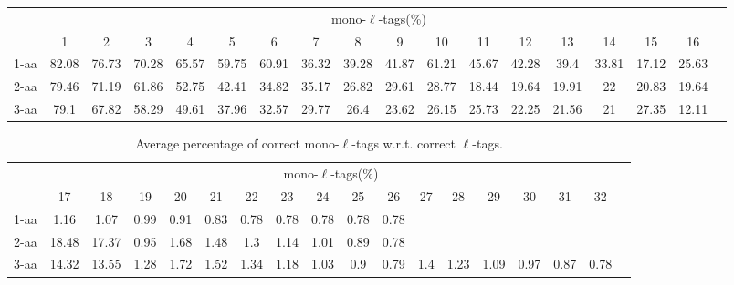 \documentclass{article}[12pt]
\begin{document}
\begin{landscape}

\begin{table}[h]\tiny
\vspace{3mm}
{\centering
\begin{center}
\begin{tabular}{|l|c|c|c|c|c|c|c|c|c|c|c|c|c|c|c|c|c|}
  \hline
  & \multicolumn{ 16 }{|c|}{mono-$\ell$-tags(\%)} \\
  \cline{2- 17}
    & 1 & 2 & 3 & 4 & 5 & 6 & 7 & 8 & 9 & 10 & 11 & 12 & 13 & 14 & 15 & 16\\
  \hline
1-aa  & 82.08 & 76.73 & 70.28 & 65.57 & 59.75 & 60.91 & 36.32 & 39.28 & 41.87 & 61.21 & 45.67 & 42.28 & 39.4 & 33.81 & 17.12 & 25.63\\
2-aa  & 79.46 & 71.19 & 61.86 & 52.75 & 42.41 & 34.82 & 35.17 & 26.82 & 29.61 & 28.77 & 18.44 & 19.64 & 19.91 & 22 & 20.83 & 19.64\\
3-aa  & 79.1 & 67.82 & 58.29 & 49.61 & 37.96 & 32.57 & 29.77 & 26.4 & 23.62 & 26.15 & 25.73 & 22.25 & 21.56 & 21 & 27.35 & 12.11\\
 \hline
\end{tabular}
\end{center}
\par}
\centering

\vspace{3mm}
\end{table}
\begin{table}[h]\tiny
\vspace{3mm}
{\centering
\begin{center}
\begin{tabular}{|l|c|c|c|c|c|c|c|c|c|c|c|c|c|c|c|c|c|}
  \hline
  & \multicolumn{ 16 }{|c|}{mono-$\ell$-tags(\%)} \\
  \cline{2- 17}
    & 17 & 18 & 19 & 20 & 21 & 22 & 23 & 24 & 25 & 26 & 27 & 28 & 29 & 30 & 31 & 32\\
  \hline
1-aa  & 1.16 & 1.07 & 0.99 & 0.91 & 0.83 & 0.78 & 0.78 & 0.78 & 0.78 & 0.78 &  &  &  &  &  & \\
2-aa  & 18.48 & 17.37 & 0.95 & 1.68 & 1.48 & 1.3 & 1.14 & 1.01 & 0.89 & 0.78 &  &  &  &  &  & \\
3-aa  & 14.32 & 13.55 & 1.28 & 1.72 & 1.52 & 1.34 & 1.18 & 1.03 & 0.9 & 0.79 & 1.4 & 1.23 & 1.09 & 0.97 & 0.87 & 0.78\\
 \hline
\end{tabular}
\end{center}
\par}
\centering

\caption{ Average percentage of correct mono-$\ell$-tags w.r.t. correct $\ell$-tags.}
\label{table:l-mono-correct-rel}

\vspace{3mm}
\end{table}
\end{landscape}
\end{document}
